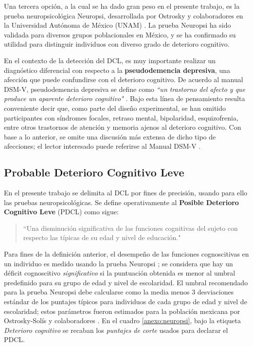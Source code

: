 \documentclass[12pt,letterpaper]{book}
\begin{document}
Una tercera opción, a la cual se ha dado gran peso en el presente trabajo, es la prueba neuropsicológica Neuropsi, desarrollada por Ostrosky y colaboradores en la Universidad Autónoma de México (UNAM) \cite{Ostrosky1999}.
%
La prueba Neuropsi ha sido validada para diversos grupos poblacionales en México, y se ha confirmado su utilidad para distinguir individuos con diverso grado de deterioro cognitivo.

En el contexto de la detección del DCL, es muy importante realizar un diagnóstico diferencial con respecto a la \textbf{pseudodemencia depresiva}, una afección que puede confundirse con el deterioro cognitivo.
%
De acuerdo al manual DSM-V, pseudodemencia depresiva se define como \textit{``un trastorno del afecto y que produce un aparente deterioro cognitivo"} \cite{DCM5}.
%
Bajo esta línea de pensamiento resulta conveniente decir que, como parte del diseño experimental, se han omitido participantes con síndromes focales, retraso mental, bipolaridad, esquizofrenia, entre otros trastornos de atención y memoria ajenos al deterioro cognitivo. 
%
Con base a lo anterior, se omite una discusión más extensa de dicho tipo de afecciones; el lector interesado puede referirse al Manual DSM-V \cite{DCM5}.


\subsection{Probable Deterioro Cognitivo Leve}

En el presente trabajo se delimita al DCL por fines de precisión, usando para ello las pruebas neuropsicológicas. 
%
Se define operativamente al \textbf{Posible Deterioro Cognitivo Leve} (PDCL) como sigue:
\begin{quote}
``Una disminución significativa de las funciones cognitivas del sujeto con respecto las típicas de su edad y nivel de educación."
\end{quote}

Para fines de la definición anterior, el desempeño de las funciones cognoscitivas en un individuo es medido usando la prueba Neuropsi \cite{Ostrosky1999}; se considera que hay un déficit cognoscitivo \textit{significativo} si la puntuación obtenida es menor al umbral predefinido para su grupo de edad y nivel de escolaridad.
%
El umbral recomendado para la prueba Neuropsi debe calcularse como la media menos 3 desviaciones estándar de los puntajes típicos para individuos de cada grupo de edad y nivel de escolaridad; estos parámetros fueron estimados para la población mexicana por Ostrosky-Solís y colaboradores \cite{Ostrosky1999}.
%
En el cuadro \ref{anexo:neuropsi}, bajo la etiqueta \textit{Deterioro cognitivo} se recaban los \textit{puntajes de corte} usados para declarar el PDCL.
\end{document}
